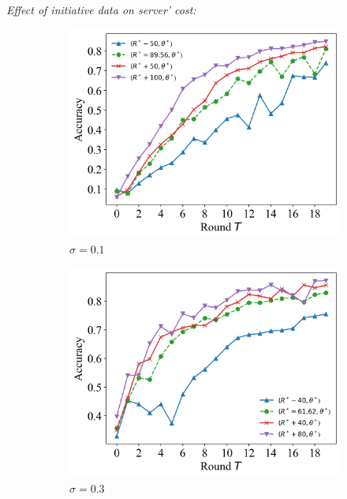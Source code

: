 \documentclass{article}
\theoremstyle{plain}
\theoremstyle{definition}
\theoremstyle{remark}
\begin{document}
\textit{Effect of initiative data on server' cost:}
\begin{figure}
	\begin{subfigure}{0.31\textwidth}
		\centering
    \includegraphics[width=\textwidth]{figures/figure_74_A.png}
    \caption{$\sigma=0.1$}
	\end{subfigure}
  \quad
	\begin{subfigure}{0.31\textwidth}
		\centering
		\includegraphics[width=\textwidth]{figures/figure_74_B.png}
    \caption{$\sigma=0.3$}
	\end{subfigure}
  \quad
  \begin{subfigure}{0.31\textwidth}
		\centering

\end{subfigure}
\end{figure}
\end{document}
